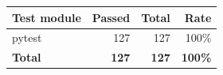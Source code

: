 \begin{tabular}{lrrr}
\toprule
\textbf{Test module} & \textbf{Passed} & \textbf{Total} & \textbf{Rate} \\
\midrule
pytest & 127 & 127 & 100\% \\
\midrule
\textbf{Total} & \textbf{127} & \textbf{127} & \textbf{100\%} \\
\bottomrule
\end{tabular}
